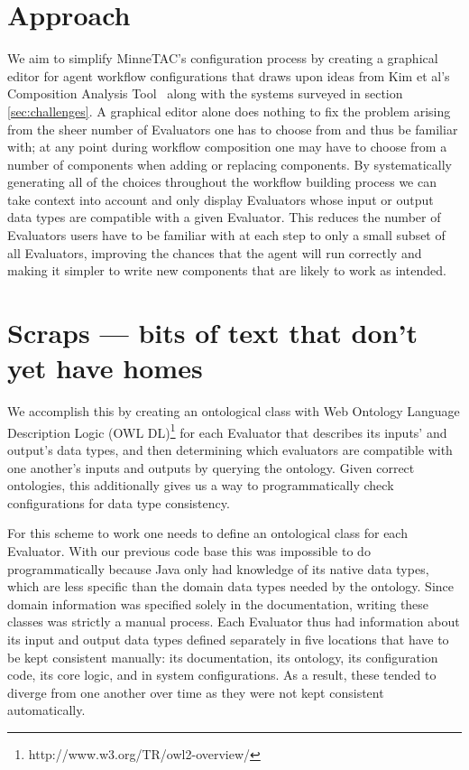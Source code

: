 \documentclass{article}
\begin{document}

\section{Approach}

We aim to simplify MinneTAC's configuration
process by creating a graphical editor for agent workflow configurations that draws upon ideas from Kim et al's Composition Analysis Tool~\cite{kim2004intelligent} along with the systems surveyed in section \ref{sec:challenges}.
A graphical editor alone does nothing to fix the problem arising
from the sheer number of Evaluators one has to choose from and thus
be familiar with; at any point during workflow composition one may have to choose from a number of components when adding or replacing components.
By systematically generating all of the choices throughout the workflow building process we can take context into account and only display Evaluators whose input or output data types are compatible with a given Evaluator.
This reduces the number of Evaluators users have to be familiar with at each step to only a small subset of all Evaluators, improving the chances that the agent will run correctly and making it simpler to write new components that are likely to work as intended.

\section{Scraps --- bits of text that don't yet have homes} %

We accomplish this by creating an ontological class with Web Ontology Language Description Logic (OWL DL)\footnote{http://www.w3.org/TR/owl2-overview/} for each Evaluator that describes its inputs' and output's data types, and then determining which evaluators are compatible with one another's inputs and outputs by querying the ontology.  Given correct ontologies, this additionally gives us a way to programmatically check configurations for data type consistency.

For this scheme to work one needs to define an ontological class for each Evaluator.  With our previous code base this was impossible to do programmatically because Java only had knowledge of its native data types, which are less specific than the domain data types needed by the ontology.  Since domain information was specified solely in the documentation, writing these classes was strictly a manual process.
Each Evaluator thus had information about its input and output data types defined separately in five locations that have to be kept consistent manually:  its documentation, its ontology, its configuration code, its core logic, and in system configurations.  As a result, these tended to diverge from one another over time as they were not kept consistent automatically.
\end{document}
